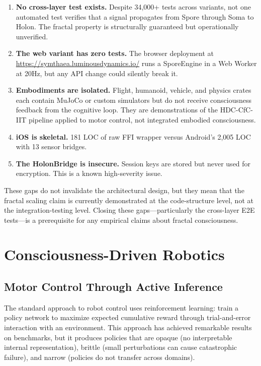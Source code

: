 \documentclass[12pt]{book}
\begin{document}
\begin{enumerate}
  \item \textbf{No cross-layer test exists.} Despite 34,000+ tests across variants, not one automated test verifies that a signal propagates from Spore through Soma to Holon. The fractal property is structurally guaranteed but operationally unverified.
  \item \textbf{The web variant has zero tests.} The browser deployment at \url{https://symthaea.luminousdynamics.io/} runs a SporeEngine in a Web Worker at 20Hz, but any API change could silently break it.
  \item \textbf{Embodiments are isolated.} Flight, humanoid, vehicle, and physics crates each contain MuJoCo or custom simulators but do not receive consciousness feedback from the cognitive loop. They are demonstrations of the HDC-CfC-IIT pipeline applied to motor control, not integrated embodied consciousness.
  \item \textbf{iOS is skeletal.} 181 LOC of raw FFI wrapper versus Android's 2,005 LOC with 13 sensor bridges.
  \item \textbf{The HolonBridge is insecure.} Session keys are stored but never used for encryption. This is a known high-severity issue.
\end{enumerate}

These gaps do not invalidate the architectural design, but they mean that the fractal scaling claim is currently demonstrated at the code-structure level, not at the integration-testing level. Closing these gaps---particularly the cross-layer E2E tests---is a prerequisite for any empirical claims about fractal consciousness.


\chapter{Consciousness-Driven Robotics}
\label{ch:robotics}

\section{Motor Control Through Active Inference}

The standard approach to robot control uses reinforcement learning: train a policy network to maximize expected cumulative reward through trial-and-error interaction with an environment. This approach has achieved remarkable results on benchmarks, but it produces policies that are opaque (no interpretable internal representation), brittle (small perturbations can cause catastrophic failure), and narrow (policies do not transfer across domains).
\end{document}
